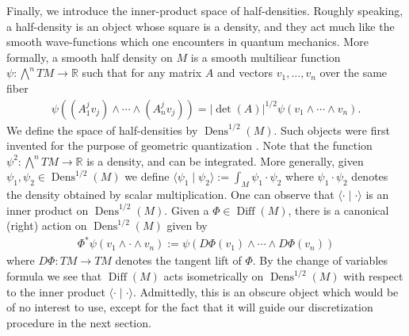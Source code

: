 \documentclass[12pt]{amsart}
\newcommand{\R}{\ensuremath{\mathbb{R}}}
\DeclareMathOperator{\Diff}{Diff}
\DeclareMathOperator{\Dens}{Dens}
\begin{document}
Finally, we introduce the inner-product space of half-densities.
Roughly speaking, a half-density is an object whose square is a density, and they act much like
the smooth wave-functions which one encounters in quantum mechanics.
More formally, a smooth half density on $M$ is a smooth multiliear function $\psi : \bigwedge^n TM \to \mathbb{R}$
such that for any matrix $A$ and vectors $v_1,\dots,v_n$ over the same fiber
\begin{align*}
	\psi( (A_1^j v_j) \wedge \cdots \wedge (A_n^j v_j) ) =  | \det(A) |^{1/2} \psi(v_1 \wedge \cdots \wedge v_n).
\end{align*}
We define the space of half-densities by $\Dens^{1/2}(M)$.
Such objects were first invented for the purpose of geometric quantization \cite[see Chapter 4]{GuilleminSternberg1970}.
Note that the function $\psi^2 : \bigwedge^n TM \to \R$ is a density, and can be integrated.
More generally, given $\psi_1,\psi_2 \in \Dens^{1/2}(M)$ we define $\langle \psi_1 \mid \psi_2 \rangle := \int_M \psi_1 \cdot \psi_2$
where $\psi_1 \cdot \psi_2 $ denotes the density obtained by scalar multiplication.
One can observe that $\langle \cdot \mid \cdot \rangle$ is an inner product on $\Dens^{1/2}(M)$.
Given a $\Phi \in \Diff(M)$, there is a canonical (right) action on $\Dens^{1/2}(M)$ given by
\begin{align*}
	\Phi^* \psi( v_1 \wedge \cdot \wedge v_n) := \psi( D\Phi(v_1) \wedge \cdots \wedge D\Phi(v_n) )
\end{align*}
where $D\Phi : TM \to TM$ denotes the tangent lift of $\Phi$.
By the change of variables formula we see that $\Diff(M)$ acts isometrically on $\Dens^{1/2}(M)$ with respect to 
the inner product $\langle \cdot \mid \cdot \rangle$.
Admittedly, this is an obscure object which would be of no interest to use, except for the fact that it will guide
our discretization procedure in the next section.
\end{document}
